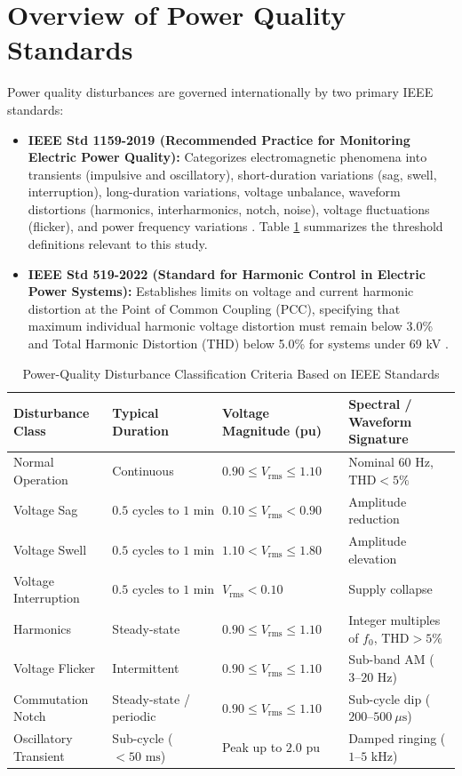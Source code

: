 \documentclass[12pt,a4paper]{report}
\begin{document}
\section{Overview of Power Quality Standards}
Power quality disturbances are governed internationally by two primary IEEE standards:
\begin{itemize}
    \item \textbf{IEEE Std 1159-2019 (Recommended Practice for Monitoring Electric Power Quality):} Categorizes electromagnetic phenomena into transients (impulsive and oscillatory), short-duration variations (sag, swell, interruption), long-duration variations, voltage unbalance, waveform distortions (harmonics, interharmonics, notch, noise), voltage fluctuations (flicker), and power frequency variations \cite{ieee1159}. Table \ref{tab:ieee1159_definitions} summarizes the threshold definitions relevant to this study.
    \item \textbf{IEEE Std 519-2022 (Standard for Harmonic Control in Electric Power Systems):} Establishes limits on voltage and current harmonic distortion at the Point of Common Coupling (PCC), specifying that maximum individual harmonic voltage distortion must remain below 3.0\% and Total Harmonic Distortion (THD) below 5.0\% for systems under 69 kV \cite{ieee519}.
\end{itemize}

\begin{table}[H]
\centering
\caption{Power-Quality Disturbance Classification Criteria Based on IEEE Standards}
\label{tab:ieee1159_definitions}
\small
\begin{tabularx}{\textwidth}{p{3.2cm}p{3.0cm}p{3.6cm}X}
\toprule
\textbf{Disturbance Class} & \textbf{Typical Duration} & \textbf{Voltage Magnitude (pu)} & \textbf{Spectral / Waveform Signature} \\
\midrule
Normal Operation & Continuous & $0.90 \le V_{\text{rms}} \le 1.10$ & Nominal $60\text{ Hz}$, $\text{THD} < 5\%$ \\
Voltage Sag & $0.5\text{ cycles to }1\text{ min}$ & $0.10 \le V_{\text{rms}} < 0.90$ & Amplitude reduction \\
Voltage Swell & $0.5\text{ cycles to }1\text{ min}$ & $1.10 < V_{\text{rms}} \le 1.80$ & Amplitude elevation \\
Voltage Interruption & $0.5\text{ cycles to }1\text{ min}$ & $V_{\text{rms}} < 0.10$ & Supply collapse \\
Harmonics & Steady-state & $0.90 \le V_{\text{rms}} \le 1.10$ & Integer multiples of $f_0$, $\text{THD} > 5\%$ \\
Voltage Flicker & Intermittent & $0.90 \le V_{\text{rms}} \le 1.10$ & Sub-band AM ($3\text{--}20\text{ Hz}$) \\
Commutation Notch & Steady-state / periodic & $0.90 \le V_{\text{rms}} \le 1.10$ & Sub-cycle dip ($200\text{--}500\ \mu\text{s}$) \\
Oscillatory Transient & Sub-cycle ($< 50\text{ ms}$) & Peak up to $2.0\text{ pu}$ & Damped ringing ($1\text{--}5\text{ kHz}$) \\
\bottomrule
\end{tabularx}
\end{table}
\end{document}
